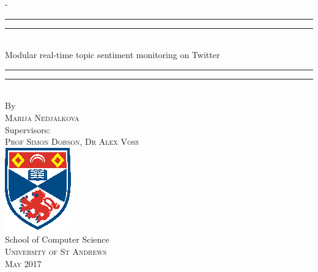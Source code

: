 \begin{titlingpage}
\begin{SingleSpace}
\calccentering{\unitlength} 
\begin{adjustwidth*}{\unitlength}{-\unitlength}
\vspace*{13mm}
\begin{center}
\rule[0.5ex]{\linewidth}{2pt}\vspace*{-\baselineskip}\vspace*{3.2pt}
\rule[0.5ex]{\linewidth}{1pt}\\[\baselineskip]
{\HUGE Modular real-time topic sentiment monitoring on Twitter }\\[4mm]
\rule[0.5ex]{\linewidth}{1pt}\vspace*{-\baselineskip}\vspace{3.2pt}
\rule[0.5ex]{\linewidth}{2pt}\\
\vspace{6.5mm}
{\large By}\\
\vspace{6.5mm}
{\large\textsc{Marija Nedjalkova}}\\
\vspace{11mm}
{\large Supervisors:}\\
\vspace{6.5mm}
{\large\textsc{Prof Simon Dobson, Dr Alex Voss}}\\
\vspace{11mm}
\includegraphics[scale=3.5]{logos/StAndrewsNoText}\\
\vspace{6mm}
{\large School of Computer Science\\
\textsc{University of St Andrews}}\\
\vspace{11mm}
\vspace{9mm}
{\large\textsc{May 2017}}
\vspace{12mm}
\end{center}
\end{adjustwidth*}
\end{SingleSpace}
\end{titlingpage}